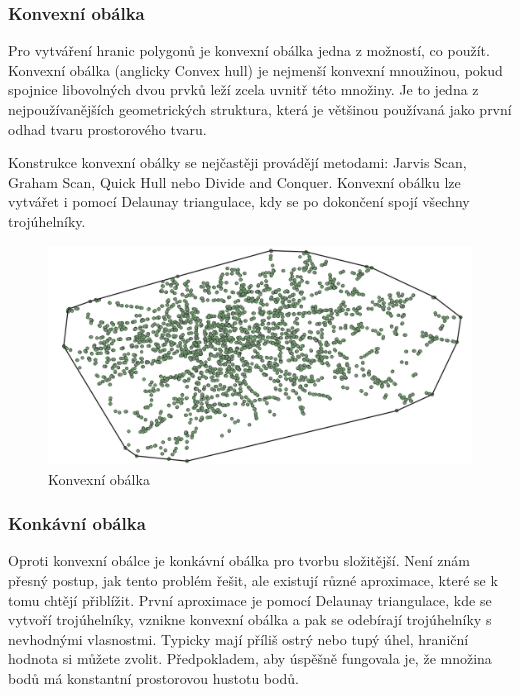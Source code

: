 \subsubsection{Konvexní obálka}

Pro vytváření hranic polygonů je konvexní obálka jedna z možností, co použít. Konvexní obálka (anglicky Convex hull)
je nejmenší konvexní mnoužinou, pokud spojnice  libovolných dvou prvků leží zcela uvnitř této množiny.
Je to jedna z nejpoužívanějších geometrických struktura, která je většinou používaná jako první odhad tvaru
prostorového tvaru.

Konstrukce konvexní obálky se nejčastěji provádějí metodami: Jarvis Scan, Graham Scan, Quick Hull nebo
Divide and Conquer. Konvexní obálku lze vytvářet i pomocí Delaunay triangulace, kdy se po dokončení
spojí všechny trojúhelníky.

\begin{figure}[H] \centering
    \includegraphics[width=400pt]{./pictures/convexHull.png}
    \caption[Konvexní obálka]{Konvexní obálka}
	\label{fig:convexHull}              
\end{figure}

\subsubsection{Konkávní obálka}
 
Oproti konvexní obálce je konkávní obálka pro tvorbu složitější. Není znám přesný postup,
jak tento problém řešit, ale existují různé aproximace, které se k tomu chtějí přiblížit.
První aproximace je pomocí Delaunay triangulace, kde se vytvoří trojúhelníky, vznikne
konvexní obálka a pak se odebírají trojúhelníky s nevhodnými vlasnostmi. Typicky mají příliš ostrý nebo tupý
úhel, hraniční hodnota si můžete zvolit.
Předpokladem, aby úspěšně fungovala je, že množina bodů má konstantní
prostorovou hustotu bodů.

